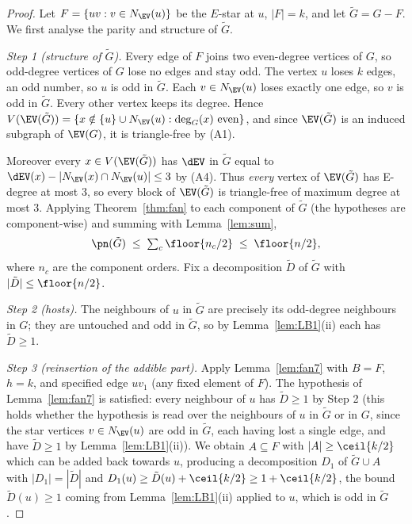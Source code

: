 \begin{proof}
Let $F=\{uv : v\in N_{\EV}(u)\}$ be the $E$-star at $u$, $|F|=k$, and let $\tilde G=G-F$. We
first analyse the parity and structure of $\tilde G$.

\emph{Step 1 (structure of $\tilde G$).}
Every edge of $F$ joins two even-degree vertices of $G$, so odd-degree vertices of $G$ lose no
edges and stay odd. The vertex $u$ loses $k$ edges, an odd number, so $u$ is odd in
$\tilde G$. Each $v\in N_{\EV}(u)$ loses exactly one edge, so $v$ is odd in $\tilde G$.
Every other vertex keeps its degree. Hence
$V(\EV(\tilde G))=\{x\notin\{u\}\cup N_{\EV}(u) : \deg_G(x)\text{ even}\}$, and since
$\EV(\tilde G)$ is an induced subgraph of $\EV(G)$, it is triangle-free by (A1).

Moreover every $x\in V(\EV(\tilde G))$ has $\dEV$ in $\tilde G$ equal to
$\dEV(x)-|N_{\EV}(x)\cap N_{\EV}(u)|\le 3$ by (A4). Thus \emph{every} vertex of $\EV(\tilde G)$
has E-degree at most $3$, so every block of $\EV(\tilde G)$ is triangle-free of maximum degree
at most $3$. Applying Theorem~\ref{thm:fan} to each component of $\tilde G$ (the hypotheses are
component-wise) and summing with Lemma~\ref{lem:sum},
\begin{equation}\label{eq:tildebound}
\pn(\tilde G)\;\le\;\textstyle\sum_c \floor{n_c/2}\;\le\;\floor{n/2},
\end{equation}
where $n_c$ are the component orders. Fix a decomposition $\tilde D$ of $\tilde G$ with
$|\tilde D|\le\floor{n/2}$.

\emph{Step 2 (hosts).}
The neighbours of $u$ in $\tilde G$ are precisely its odd-degree neighbours in $G$; they are
untouched and odd in $\tilde G$, so by Lemma~\ref{lem:LB1}(ii) each has $\tilde D\ge 1$.

\emph{Step 3 (reinsertion of the addible part).}
Apply Lemma~\ref{lem:fan7} with $B=F$, $h=k$, and specified edge $uv_1$ (any fixed element of
$F$). The hypothesis of Lemma~\ref{lem:fan7} is satisfied: every neighbour of $u$ has
$\tilde D\ge 1$ by Step 2 (this holds whether the hypothesis is read over the neighbours of $u$
in $\tilde G$ or in $G$, since the star vertices $v\in N_{\EV}(u)$ are odd in $\tilde G$, each
having lost a single edge, and have $\tilde D\ge 1$ by Lemma~\ref{lem:LB1}(ii)). We obtain
$A\subseteq F$ with $|A|\ge\ceil{k/2}$ which can be added back towards $u$, producing a
decomposition $D_1$ of $\tilde G\cup A$ with $|D_1|=|\tilde D|$ and
$D_1(u)\ge \tilde D(u)+\ceil{k/2}\ge 1+\ceil{k/2}$, the bound $\tilde D(u)\ge1$ coming from
Lemma~\ref{lem:LB1}(ii) applied to $u$, which is odd in $\tilde G$.


\end{proof}
